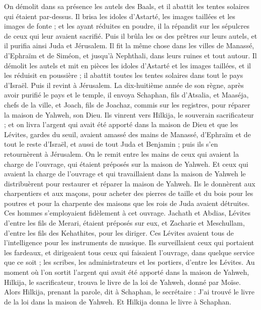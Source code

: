 \begin{multicols}{2}
On démolit dans sa présence les autels des Baals, et il abattit les tentes solaires qui étaient par-dessus. Il brisa les idoles d'Astarté, les images taillées et les images de fonte ; et les ayant réduites en poudre, il la répandit sur les sépulcres de ceux qui leur avaient sacrifié.
Puis il brûla les os des prêtres sur leurs autels, et il purifia ainsi Juda et Jérusalem.
Il fit la même chose dans les villes de Manassé, d'Ephraïm et de Siméon, et jusqu'à Nephthali, dans leurs ruines et tout autour.
Il démolit les autels et mit en pièces les idoles d'Astarté et les images taillées, et il les réduisit en poussière ; il abattit toutes les tentes solaires dans tout le pays d'Israël. Puis il revint à Jérusalem.
La dix-huitième année de son règne, après avoir purifié le pays et le temple, il envoya Schaphan, fils d'Atsalia, et Maaséja, chefs de la ville, et Joach, fils de Joachaz, commis sur les registres, pour réparer la maison de Yahweh, son Dieu.
Ils vinrent vers Hilkija, le souverain sacrificateur ; et on livra l'argent qui avait été apporté dans la maison de Dieu et que les Lévites, gardes du seuil, avaient amassé des mains de Manassé, d'Ephraïm et de tout le reste d'Israël, et aussi de tout Juda et Benjamin ; puis ils s'en retournèrent à Jérusalem.
On le remit entre les mains de ceux qui avaient la charge de l'ouvrage, qui étaient préposés sur la maison de Yahweh. Et ceux qui avaient la charge de l'ouvrage et qui travaillaient dans la maison de Yahweh le distribuèrent pour restaurer et réparer la maison de Yahweh.
Ils le donnèrent aux charpentiers et aux maçons, pour acheter des pierres de taille et du bois pour les poutres et pour la charpente des maisons que les rois de Juda avaient détruites.
Ces hommes s'employaient fidèlement à cet ouvrage. Jachath et Abdias, Lévites d'entre les fils de Merari, étaient préposés sur eux, et Zacharie et Meschullam, d'entre les fils des Kehathites, pour les diriger. Ces Lévites avaient tous de l’intelligence pour les instruments de musique.
Ils surveillaient ceux qui portaient les fardeaux, et dirigeaient tous ceux qui faisaient l'ouvrage, dans quelque service que ce soit ; les scribes, les administrateurs et les portiers, d'entre les Lévites.
Au moment où l'on sortit l'argent qui avait été apporté dans la maison de Yahweh, Hilkija, le sacrificateur, trouva le livre de la loi de Yahweh, donné par Moïse.
Alors Hilkija, prenant la parole, dit à Schaphan, le secrétaire : J'ai trouvé le livre de la loi dans la maison de Yahweh. Et Hilkija donna le livre à Schaphan.

\end{multicols}
